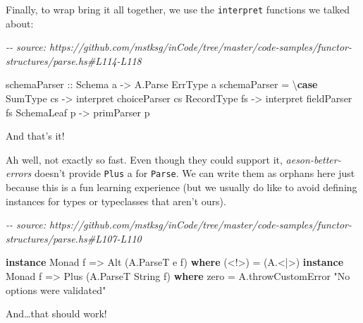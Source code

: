 \documentclass[]{article}
\newenvironment{Shaded}{}{}
\newcommand{\CommentTok}[1]{\textcolor[rgb]{0.38,0.63,0.69}{\textit{#1}}}
\newcommand{\DataTypeTok}[1]{\textcolor[rgb]{0.56,0.13,0.00}{#1}}
\newcommand{\KeywordTok}[1]{\textcolor[rgb]{0.00,0.44,0.13}{\textbf{#1}}}
\newcommand{\NormalTok}[1]{#1}
\newcommand{\OperatorTok}[1]{\textcolor[rgb]{0.40,0.40,0.40}{#1}}
\newcommand{\OtherTok}[1]{\textcolor[rgb]{0.00,0.44,0.13}{#1}}
\newcommand{\StringTok}[1]{\textcolor[rgb]{0.25,0.44,0.63}{#1}}
\begin{document}
Finally, to wrap bring it all together, we use the \texttt{interpret} functions
we talked about:

\begin{Shaded}
\begin{Highlighting}[]
\CommentTok{{-}{-} source: https://github.com/mstksg/inCode/tree/master/code{-}samples/functor{-}structures/parse.hs\#L114{-}L118}

\OtherTok{schemaParser ::} \DataTypeTok{Schema}\NormalTok{ a }\OtherTok{{-}>} \DataTypeTok{A.Parse} \DataTypeTok{ErrType}\NormalTok{ a}
\NormalTok{schemaParser }\OtherTok{=}\NormalTok{ \textbackslash{}}\KeywordTok{case}
    \DataTypeTok{SumType}\NormalTok{    cs }\OtherTok{{-}>}\NormalTok{ interpret choiceParser cs}
    \DataTypeTok{RecordType}\NormalTok{ fs }\OtherTok{{-}>}\NormalTok{ interpret fieldParser fs}
    \DataTypeTok{SchemaLeaf}\NormalTok{ p  }\OtherTok{{-}>}\NormalTok{ primParser p}
\end{Highlighting}
\end{Shaded}

And that's it!

Ah well, not exactly so fast. Even though they could support it,
\emph{aeson-better-errors} doesn't provide \texttt{Plus} a for \texttt{Parse}.
We can write them as orphans here just because this is a fun learning experience
(but we usually do like to avoid defining instances for types or typeclasses
that aren't ours).

\begin{Shaded}
\begin{Highlighting}[]
\CommentTok{{-}{-} source: https://github.com/mstksg/inCode/tree/master/code{-}samples/functor{-}structures/parse.hs\#L107{-}L110}

\KeywordTok{instance} \DataTypeTok{Monad}\NormalTok{ f }\OtherTok{=>} \DataTypeTok{Alt}\NormalTok{ (}\DataTypeTok{A.ParseT}\NormalTok{ e f) }\KeywordTok{where}
\NormalTok{    (}\OperatorTok{<!>}\NormalTok{) }\OtherTok{=}\NormalTok{ (}\OperatorTok{A.<|>}\NormalTok{)}
\KeywordTok{instance} \DataTypeTok{Monad}\NormalTok{ f }\OtherTok{=>} \DataTypeTok{Plus}\NormalTok{ (}\DataTypeTok{A.ParseT} \DataTypeTok{String}\NormalTok{ f) }\KeywordTok{where}
\NormalTok{    zero  }\OtherTok{=}\NormalTok{ A.throwCustomError }\StringTok{"No options were validated"}
\end{Highlighting}
\end{Shaded}

And\ldots that should work!
\end{document}
